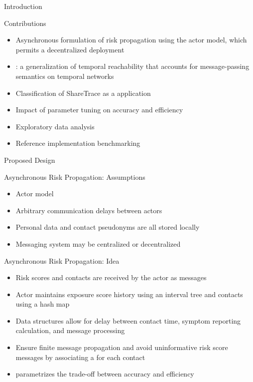 \documentclass[11pt]{beamer}
\begin{document}
\begin{section}{Introduction}
\begin{frame}{Contributions}
\begin{itemize}
  \item Asynchronous formulation of risk propagation using the actor model, which permits a decentralized deployment
  \pause
  \item {}: a generalization of temporal reachability that accounts for message-passing semantics on temporal networks
  \pause
  \item Classification of ShareTrace as a  application
  \pause
  \item Impact of parameter tuning on accuracy and efficiency
  \pause
  \item Exploratory data analysis
  \pause
  \item Reference implementation benchmarking
\end{itemize}
\end{frame}

\end{section}

\begin{section}{Proposed Design}

\begin{frame}{Asynchronous Risk Propagation: Assumptions}
\begin{itemize}
  \item Actor model \citep{Hewitt1973, Hewitt1977a, Hewitt1977b, Agha1985}
  \pause
  \item Arbitrary communication delays between actors
  \pause
  \item Personal data and contact pseudonyms are all stored locally
  \pause
  \item Messaging system may be centralized or decentralized
\end{itemize}
\end{frame}

\begin{frame}{Asynchronous Risk Propagation: Idea}
\begin{itemize}
  \item Risk scores and contacts are received by the actor as messages
  \pause
  \item Actor maintains exposure score history using an interval tree and contacts using a hash map
  \pause
  \item Data structures allow for delay between contact time, symptom reporting calculation, and message processing
  \pause
  \item Ensure finite message propagation and avoid uninformative risk score messages by associating a  for each contact
  \pause
  \item {} parametrizes the trade-off between accuracy and efficiency
\end{itemize}
\end{frame}

\end{section}
\end{document}
